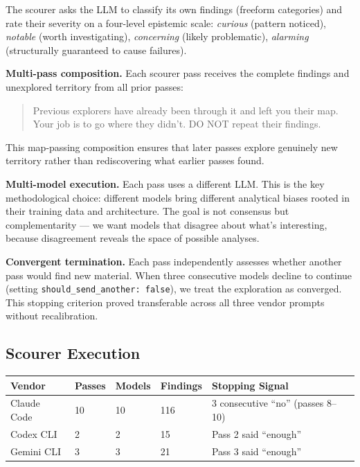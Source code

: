 The scourer asks the LLM to classify its own findings (freeform
categories) and rate their severity on a four-level epistemic scale:
\emph{curious} (pattern noticed), \emph{notable} (worth investigating),
\emph{concerning} (likely problematic), \emph{alarming} (structurally
guaranteed to cause failures).

\textbf{Multi-pass composition.} Each scourer pass receives the complete
findings and unexplored territory from all prior passes:

\begin{quote}
Previous explorers have already been through it and left you their map.
Your job is to go where they didn't. DO NOT repeat their findings.
\end{quote}

This map-passing composition ensures that later passes explore genuinely
new territory rather than rediscovering what earlier passes found.

\textbf{Multi-model execution.} Each pass uses a different LLM. This is
the key methodological choice: different models bring different
analytical biases rooted in their training data and architecture. The
goal is not consensus but complementarity --- we want models that
disagree about what's interesting, because disagreement reveals the
space of possible analyses.

\textbf{Convergent termination.} Each pass independently assesses
whether another pass would find new material. When three consecutive
models decline to continue (setting
\texttt{should\_send\_another:\ false}), we treat the exploration as
converged. This stopping criterion proved transferable across all three
vendor prompts without recalibration.

\subsection{Scourer Execution}

\begin{table}[t]
\small
\begin{tabular}{@{}lllll@{}}
\toprule
Vendor & Passes & Models & Findings & Stopping Signal \\
\midrule
Claude Code & 10 & 10 & 116 & 3 consecutive ``no'' (passes 8--10) \\
Codex CLI & 2 & 2 & 15 & Pass 2 said ``enough'' \\
Gemini CLI & 3 & 3 & 21 & Pass 3 said ``enough'' \\
\bottomrule
\end{tabular}
\end{table}

